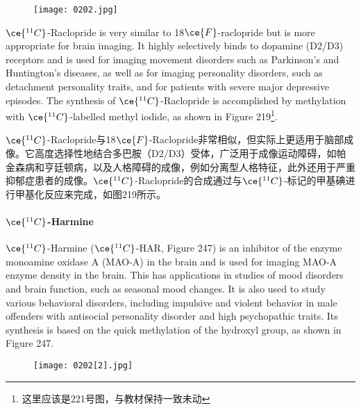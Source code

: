 \documentclass[dvipsnames, svgnames,a4paper,11pt]{article}
\begin{document}
\setcounter{figure}{245}


\begin{wrapfigure}{r}{0.4\textwidth}
    \centering
    \texttt{[image: 0202.jpg]}
     \label{fig246a}

\end{wrapfigure}

\(\ce{^{11}C}\)-Raclopride is very similar to 18\(\ce{F}\)-raclopride but is more appropriate for brain imaging. It highly selectively binds to dopamine (D2/D3) receptors and is used for imaging movement disorders such as Parkinson's and Huntington's diseases, as well as for imaging personality disorders, such as detachment personality traits, and for patients with severe major depressive episodes. The synthesis of \(\ce{^{11}C}\)-Raclopride is accomplished by methylation with \(\ce{^{11}C}\)-labelled methyl iodide, as shown in Figure 219\footnote{这里应该是221号图，与教材保持一致未动}.

\(\ce{^{11}C}\)-Raclopride与18\(\ce{F}\)-Raclopride非常相似，但实际上更适用于脑部成像。它高度选择性地结合多巴胺（D2/D3）受体，广泛用于成像运动障碍，如帕金森病和亨廷顿病，以及人格障碍的成像，例如分离型人格特征，此外还用于严重抑郁症患者的成像。\(\ce{^{11}C}\)-Raclopride的合成通过与\(\ce{^{11}C}\)-标记的甲基碘进行甲基化反应来完成，如图219所示。

\paragraph{\(\ce{^{11}C}\)-Harmine}  
\(\ce{^{11}C}\)-Harmine (\(\ce{^{11}C}\)-HAR, Figure 247) is an inhibitor of the enzyme monoamine oxidase A (MAO-A) in the brain and is used for imaging MAO-A enzyme density in the brain. This has applications in studies of mood disorders and brain function, such as seasonal mood changes. It is also used to study various behavioral disorders, including impulsive and violent behavior in male offenders with antisocial personality disorder and high psychopathic traits. Its synthesis is based on the quick methylation of the hydroxyl group, as shown in Figure 247.

\begin{figure}[h]
	\centering
    \texttt{[image: 0202[2].jpg]}  
     \label{fig247}
\end{figure}
\end{document}

